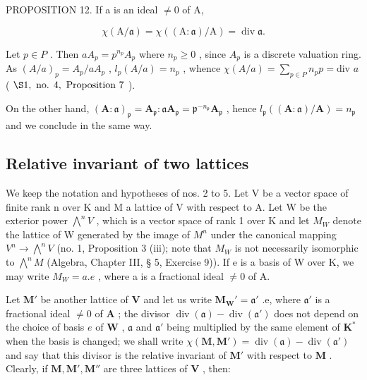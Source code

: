 PROPOSITION 12. If a is an ideal \(\neq 0\) of A,

\[
\chi (\mathrm{A} / \mathfrak {a}) = \chi ((\mathrm{A}: \mathfrak {a}) / \mathrm{A}) = \operatorname{div} \mathfrak {a}.
\]

Let \(p \in P\) . Then \(aA_p = p^{n_p}A_p\) where \(n_p \geqslant 0\) , since \(A_p\) is a discrete valuation ring. As \((A/a)_p = A_p/aA_p\) , \(l_p(A/a) = n_p\) , whence \(\chi(A/a) = \sum_{p \in P} n_p p = \text{div } a\) ( \(\S 1, \text{ no. } 4, \text{ Proposition } 7\) ).

On the other hand, \((\mathbf{A}:\mathfrak{a})_{\mathfrak{p}} = \mathbf{A}_{\mathfrak{p}}\colon \mathfrak{a}\mathbf{A}_{\mathfrak{p}} = \mathfrak{p}^{-n_{\mathfrak{p}}}\mathbf{A}_{\mathfrak{p}}\) , hence \(l_{\mathfrak{p}}((\mathbf{A}:\mathfrak{a}) / \mathbf{A}) = n_{\mathfrak{p}}\) and we conclude in the same way.

\subsection{Relative invariant of two lattices}

We keep the notation and hypotheses of nos. 2 to 5. Let V be a vector space of finite rank n over K and M a lattice of V with respect to A. Let W be the exterior power \(\bigwedge^{n}V\) , which is a vector space of rank 1 over K and let \(M_{W}\) denote the lattice of W generated by the image of \(M^{n}\) under the canonical mapping \(V^{n}\to\bigwedge^{n}V\) (no. 1, Proposition 3 (iii); note that \(M_{W}\) is not necessarily isomorphic to \(\bigwedge^{n}M\) (Algebra, Chapter III, § 5, Exercise 9)). If e is a basis of W over K, we may write \(M_{W}=a.e\) , where a is a fractional ideal \(\neq0\) of A.

Let \(\mathbf{M}'\) be another lattice of \(\mathbf{V}\) and let us write \(\mathbf{M}_{\mathbf{W}}' = \mathfrak{a}'\) .e, where \(\mathfrak{a}'\) is a fractional ideal \(\neq 0\) of \(\mathbf{A}\) ; the divisor \(\operatorname{div}(\mathfrak{a}) - \operatorname{div}(\mathfrak{a}')\) does not depend on the choice of basis \(e\) of \(\mathbf{W}\) , \(\mathfrak{a}\) and \(\mathfrak{a}'\) being multiplied by the same element of \(\mathbf{K}^*\) when the basis is changed; we shall write \(\chi(\mathbf{M}, \mathbf{M}') = \operatorname{div}(\mathfrak{a}) - \operatorname{div}(\mathfrak{a}')\) and say that this divisor is the relative invariant of \(\mathbf{M}'\) with respect to \(\mathbf{M}\) . Clearly, if \(\mathbf{M}, \mathbf{M}', \mathbf{M}''\) are three lattices of \(\mathbf{V}\) , then:

